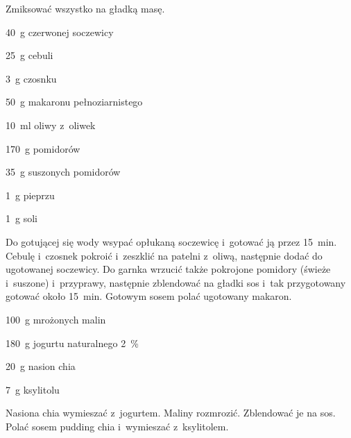 \documentclass[../main.tex]{subfiles}
\begin{document}
Zmiksować wszystko na gładką masę.


\begin{Ingred}
    \item \qty{40}{\gram} czerwonej soczewicy
    \item \qty{25}{\gram} cebuli
    \item \qty{3}{\gram} czosnku
    \item \qty{50}{\gram} makaronu pełnoziarnistego
    \item \qty{10}{\milli\litre} oliwy z~oliwek
    \item \qty{170}{\gram} pomidorów
    \item \qty{35}{\gram} suszonych pomidorów
    \item \qty{1}{\gram} pieprzu
    \item \qty{1}{\gram} soli
\end{Ingred}

Do gotującej się wody wsypać opłukaną soczewicę i~gotować ją przez
\qty{15}{\minute}. Cebulę i~czosnek pokroić i~zeszklić na patelni z~oliwą,
następnie dodać do ugotowanej soczewicy. Do garnka wrzucić także pokrojone
pomidory (świeże i~suszone) i~przyprawy, następnie zblendować na gładki sos
i~tak przygotowany gotować około \qty{15}{\minute}. Gotowym sosem polać
ugotowany makaron.


\begin{Ingred}
    \item \qty{100}{\gram} mrożonych malin
    \item \qty{180}{\gram} jogurtu naturalnego \qty{2}{\percent}
    \item \qty{20}{\gram} nasion chia
    \item \qty{7}{\gram} ksylitolu
\end{Ingred}

Nasiona chia wymieszać z~jogurtem. Maliny rozmrozić. Zblendować je na sos.
Polać sosem pudding chia i~wymieszać z~ksylitolem.

\end{document}
